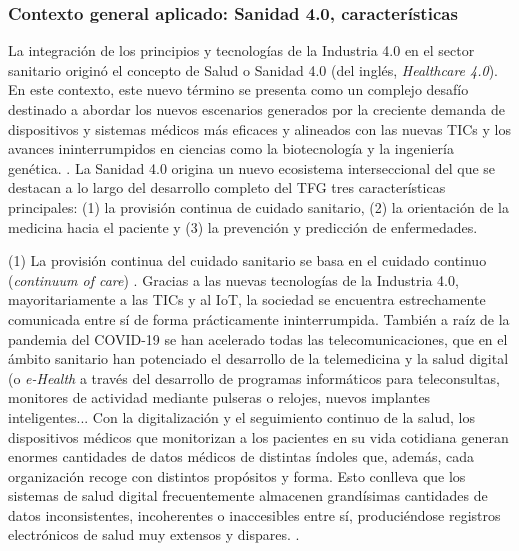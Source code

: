 
\subsubsection{Contexto general aplicado: Sanidad 4.0, características}

La integración de los principios y tecnologías de la Industria 4.0 en el sector sanitario originó el concepto de Salud o Sanidad 4.0 (del inglés, \textit{Healthcare 4.0})\cite{tortorella2020healthcare}\cite{tortorella2021impacts}.  %
En este contexto, este nuevo término se presenta como un complejo desafío  destinado a abordar los nuevos escenarios generados por la creciente demanda de dispositivos y sistemas médicos más eficaces y alineados con las nuevas TICs y los avances ininterrumpidos en ciencias como la biotecnología y la ingeniería genética. \cite{martin2021ehealth}. La Sanidad 4.0 origina un nuevo ecosistema interseccional del que se destacan a lo largo del desarrollo completo del TFG  tres  características principales: (1) la provisión continua de cuidado sanitario, (2) la orientación de la medicina hacia el paciente y (3) la prevención y predicción de enfermedades.


(1) La provisión continua del cuidado sanitario se basa en el cuidado continuo (\textit{continuum of care}) \cite{kouroubali2019new}. Gracias a las nuevas tecnologías de la Industria 4.0, mayoritariamente a las TICs y al IoT, la sociedad se encuentra estrechamente comunicada entre sí de forma prácticamente ininterrumpida. También a raíz de la pandemia del COVID-19 se han acelerado todas las telecomunicaciones, que en el ámbito sanitario han potenciado el desarrollo de la telemedicina y la salud digital (o \textit{e-Health} \cite{martin2021ehealth} a través del desarrollo de programas informáticos para teleconsultas, monitores de actividad mediante pulseras o relojes, nuevos implantes inteligentes... Con la digitalización y el seguimiento continuo de la salud, los dispositivos médicos que monitorizan a los pacientes en su vida cotidiana generan enormes cantidades de datos médicos de distintas índoles que, además, cada organización recoge con distintos propósitos y forma. Esto conlleva que los sistemas de salud digital frecuentemente almacenen grandísimas cantidades de datos inconsistentes, incoherentes o inaccesibles entre sí, produciéndose registros electrónicos de salud muy extensos y dispares. \cite{kouroubali2019new}. 

